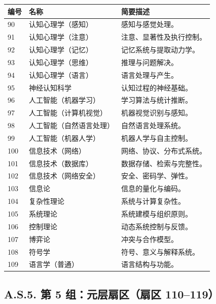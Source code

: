 \documentclass[11pt,a4paper]{article}
\begin{document}
	\begin{longtable}{|p{0.9cm}|p{6.0cm}|p{8.6cm}|}
		\hline
		\textbf{编号} & \textbf{名称} & \textbf{简要描述} \\
		\hline
		\endhead
		90 & 认知心理学（感知） & 感知与感觉处理。 \\
		91 & 认知心理学（注意） & 注意、显著性及执行控制。 \\
		92 & 认知心理学（记忆） & 记忆系统与提取动力学。 \\
		93 & 认知心理学（思维） & 推理与问题解决。 \\
		94 & 认知心理学（语言） & 语言处理与产生。 \\
		95 & 神经认知科学 & 认知过程的神经基础。 \\
		96 & 人工智能（机器学习） & 学习算法与统计推断。 \\
		97 & 人工智能（计算机视觉） & 机器视觉识别与感知。 \\
		98 & 人工智能（自然语言处理） & 自然语言处理系统。 \\
		99 & 人工智能（机器人学） & 机器人学与自主控制。 \\
		100 & 信息技术（网络） & 网络、协议、分布式系统。 \\
		101 & 信息技术（数据库） & 数据存储、检索与完整性。 \\
		102 & 信息技术（网络安全） & 安全、密码学、弹性。 \\
		103 & 信息论 & 信息的量化与编码。 \\
		104 & 复杂性理论 & 系统与计算复杂性。 \\
		105 & 系统理论 & 系统建模与组织原则。 \\
		106 & 控制理论 & 动态系统控制与反馈。 \\
		107 & 博弈论 & 冲突与合作模型。 \\
		108 & 符号学 & 符号、意义与解释系统。 \\
		109 & 语言学（普通） & 语言结构与功能。 \\
		\hline
	\end{longtable}
	
	\subsection*{A.S.5. 第 5 组：元层扇区（扇区 110--119）}
	
\end{document}
